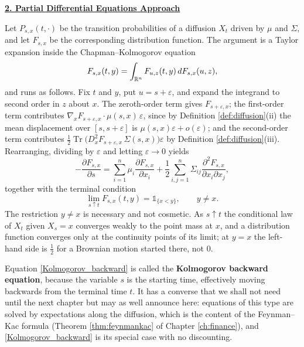 \vspace{0.3cm}

\textbf{\underline{2. Partial Differential Equations Approach}}
\vspace{0.2cm}

Let $P_{s,x}(t,\cdot)$ be the transition probabilities of a diffusion $X_t$ driven by $\mu$
and $\Sigma$, and let $F_{s,x}$ be the corresponding distribution function. The argument is a Taylor
expansion inside the Chapman--Kolmogorov equation
\[
F_{s,x}(t,y) = \int_{\mathbb{R}^n} F_{u,z}(t,y)\,dF_{s,x}(u,z),
\]
and runs as follows. Fix $t$ and $y$, put $u = s+\varepsilon$, and expand the integrand to second
order in $z$ about $x$. The zeroth-order term gives $F_{s+\varepsilon,x}$; the first-order term
contributes $\nabla_x F_{s+\varepsilon,x}\cdot\mu(s,x)\,\varepsilon$, since by Definition
\ref{def:diffusion}(ii) the mean displacement over $[s,s+\varepsilon]$ is $\mu(s,x)\varepsilon +
o(\varepsilon)$; and the second-order term contributes
$\tfrac12\operatorname{Tr}\bigl(D^2_x F_{s+\varepsilon,x}\,\Sigma(s,x)\bigr)\varepsilon$ by Definition
\ref{def:diffusion}(iii). Rearranging, dividing by $\varepsilon$ and letting $\varepsilon \to 0$
yields
\begin{equation}\label{Kolmogorov_backward}
    -\frac{\partial F_{s,x}}{\partial s} = \sum_{i=1}^n \mu_i \frac{\partial F_{s,x}}{\partial x_i} + \frac{1}{2} \sum_{i,j=1}^n \Sigma_{ij} \frac{\partial^2 F_{s,x}}{\partial x_i \partial x_j},
\end{equation}
together with the terminal condition
\begin{equation}
    \lim_{s\uparrow t} F_{s,x}(t,y) = \mathds{1}_{\{x < y\}}, \qquad y \neq x .
\end{equation}
The restriction $y\neq x$ is necessary and not cosmetic. As $s \uparrow t$ the conditional law of
$X_t$ given $X_s = x$ converges weakly to the point mass at $x$, and a distribution function
converges only at the continuity points of its limit; at $y = x$ the left-hand side is $\tfrac12$
for a Brownian motion started there, not $0$.

Equation \eqref{Kolmogorov_backward} is called the \textbf{Kolmogorov backward equation}, because the
variable $s$ is the starting time, effectively moving backwards from the terminal time $t.$ It has a
converse that we shall not need until the next chapter but may as well announce here: equations of
this type are solved by expectations along the diffusion, which is the content of the Feynman--Kac
formula (Theorem \ref{thm:feynmankac} of Chapter \ref{ch:finance}), and \eqref{Kolmogorov_backward}
is its special case with no discounting.

